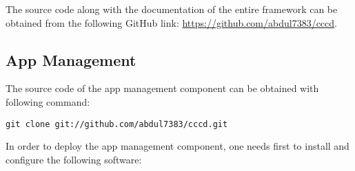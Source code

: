 The source code along with the documentation of the entire framework can be obtained from the following GitHub link: \url{https://github.com/abdul7383/cccd}.

\subsection{App Management\label{sec:eval_te_en_app}}
The source code of the app management component can be obtained with following command:
\begin{code}
\begin{verbatim}
git clone git://github.com/abdul7383/cccd.git
\end{verbatim}
\end{code}

In order to deploy the app management component, one needs first to install and configure the following software:

